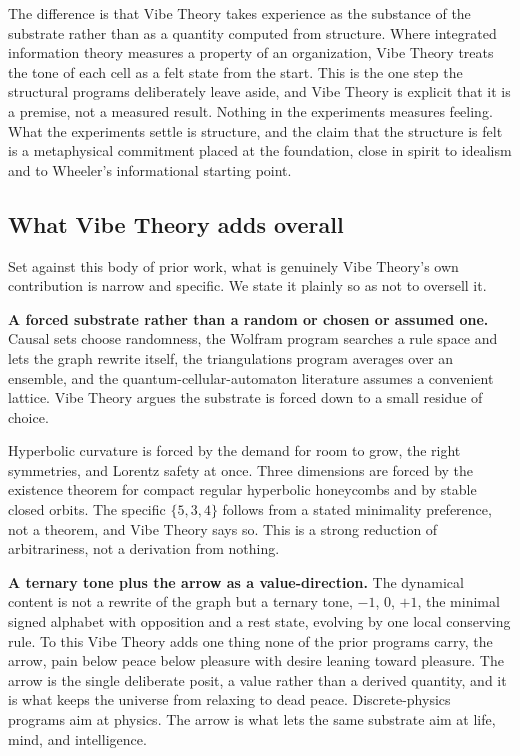 The difference is that Vibe Theory takes experience as the substance of the substrate rather than as a
quantity computed from structure. Where integrated information theory measures a property of an organization,
Vibe Theory treats the tone of each cell as a felt state from the start. This is the one step the structural
programs deliberately leave aside, and Vibe Theory is explicit that it is a premise, not a measured result.
Nothing in the experiments measures feeling. What the experiments settle is structure, and the claim that the
structure is felt is a metaphysical commitment placed at the foundation, close in spirit to idealism and to
Wheeler's informational starting point.

\subsection{What Vibe Theory adds overall}

Set against this body of prior work, what is genuinely Vibe Theory's own contribution is narrow and specific.
We state it plainly so as not to oversell it.

\textbf{A forced substrate rather than a random or chosen or assumed one.} Causal sets choose randomness, the
Wolfram program searches a rule space and lets the graph rewrite itself, the triangulations program averages
over an ensemble, and the quantum-cellular-automaton literature assumes a convenient lattice. Vibe Theory
argues the substrate is forced down to a small residue of choice.

Hyperbolic curvature is forced by the demand
for room to grow, the right symmetries, and Lorentz safety at once. Three dimensions are forced by the
existence theorem for compact regular hyperbolic honeycombs and by stable closed orbits. The specific
$\{5,3,4\}$ follows from a stated minimality preference, not a theorem, and Vibe Theory says so. This is a
strong reduction of arbitrariness, not a derivation from nothing.

\textbf{A ternary tone plus the arrow as a value-direction.} The dynamical content is not a rewrite of the
graph but a ternary tone, $-1$, $0$, $+1$, the minimal signed alphabet with opposition and a rest state,
evolving by one local conserving rule. To this Vibe Theory adds one thing none of the prior programs carry,
the arrow, pain below peace below pleasure with desire leaning toward pleasure. The arrow is the single
deliberate posit, a value rather than a derived quantity, and it is what keeps the universe from relaxing to
dead peace. Discrete-physics programs aim at physics. The arrow is what lets the same substrate aim at life,
mind, and intelligence.

